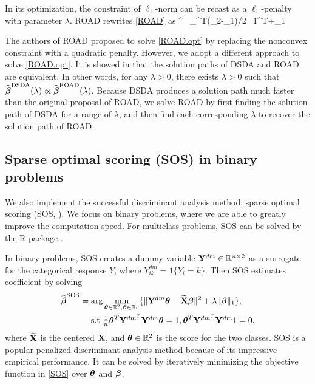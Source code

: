 In its optimization, the constraint of $\ell_1$-norm can be recast as a $\ell_1$-penalty with parameter $\lambda$. ROAD rewrites \eqref{ROAD} as
\beq\label{ROAD.opt}
\widehat{\bolbeta}^{}=\arg\min_{\bolbeta^T(\widehat{\bolmu}_2-\widehat{\bolmu}_1)/2=1}\bolbeta^T\widehat{\bolSigma}\bolbeta+\lambda\Vert\bolbeta\Vert_1
\eeq  


The authors of ROAD proposed to solve \eqref{ROAD.opt} by replacing the nonconvex constraint with a quadratic penalty. However, we adopt a different approach to solve \eqref{ROAD.opt}. It is showed in \citet{Mai2013note} that the solution paths of DSDA and ROAD are equivalent. In other words, for any $\lambda>0$, there exists $\tilde\lambda>0$ such that $\widehat{\boldsymbol{\beta}}^{\text{DSDA}}(\lambda)\propto \widehat{\boldsymbol{\beta}}^{\text{ROAD}}(\tilde{\lambda})$. Because DSDA produces a solution path much faster than the original proposal of ROAD, we solve ROAD by first finding the solution path of DSDA for a range of $\lambda$, and then find each corresponding $\tilde{\lambda}$ to recover the solution path of ROAD.





\subsection{Sparse optimal scoring (SOS) in binary problems}


We also implement the successful discriminant analysis method, sparse optimal scoring (SOS, \cite{Clemmensen}). We focus on binary problems, where we are able to greatly improve the computation speed. For multiclass problems, SOS can be solved by the R package .

In binary problems, SOS creates a dummy variable $\mathbf{Y}^{dm}\in\mathbb{R}^{n\times 2}$ as a surrogate for the categorical response $Y$, where $Y_{ik}^{dm}=1\{Y_{i}=k\}$. Then SOS estimates coefficient by solving
\begin{align}\label{SOS}
\widehat{\boldsymbol{\beta}}^{\text{SOS}}&=\arg\min_{\boldsymbol{\theta}\in\mathbb{R}^2,\boldsymbol{\beta}\in\mathbb{R}^p}\{\Vert\mathbf{Y}^{dm}\boldsymbol{\theta}-\widetilde{\mathbf{X}}\boldsymbol{\beta}\Vert^2+\lambda\Vert\boldsymbol{\beta}\Vert_1\}, \nonumber\\
&\quad\mbox{ s.t $\frac{1}{n}\boldsymbol{\theta}^T\mathbf{Y}^{dm^T}\mathbf{Y}^{dm}\boldsymbol{\theta}=1, \boldsymbol{\theta}^T\mathbf{Y}^{dm^T}\mathbf{Y}^{dm}1=0$},
\end{align}
where $\widetilde{\mathbf{X}}$ is the centered $\mathbf{X}$, and $\boldsymbol{\theta}\in\mathbb{R}^{2}$ is the score for the two classes. SOS is a popular penalized discriminant analysis method because of its impressive empirical performance. It can be solved by iteratively minimizing the objective function in \eqref{SOS} over $\boldsymbol{\theta}$ and $\boldsymbol{\beta}$. 


